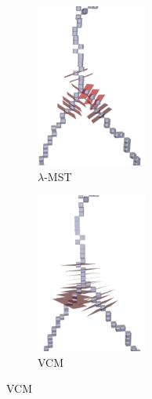 \documentclass{beamer}
\begin{document}
\begin{frame}
	\vspace{-0.5cm}
	\begin{figure}[H]
		\centering
		\begin{subfigure}[t]{0.5\textwidth}
			\centering
			\includegraphics[clip, trim=0cm 0cm 0 0cm, width=0.4\textwidth]{fig/mst_branching.png}
			\caption{$\lambda$-MST}
		\end{subfigure}%
		\begin{subfigure}[t]{0.5\textwidth}
			\centering
			\includegraphics[clip, trim=0cm 0 0cm 3cm, width=0.4\textwidth]{fig/vcm_branching_3_15.png}
			\caption{VCM}
			\label{fig:vcmbranching}    
		\end{subfigure} 
	\end{figure}
\end{frame}
\end{document}
